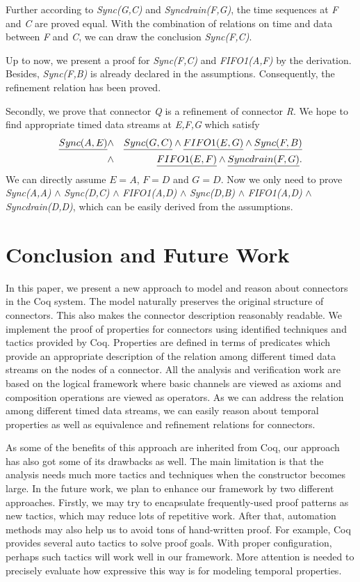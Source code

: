 \documentclass{llncs}
\begin{document}
\begin{example}[Equivalence]
Further according to \emph{Sync(G,C)} and \emph{Syncdrain(F,G)}, the time sequences at \emph{F} and \emph{C} are proved equal. With the combination of relations on time and data between \emph{F} and \emph{C}, we can draw the conclusion \emph{Sync(F,C)}.


Up to now, we present a proof for \emph{Sync(F,C)} and \emph{FIFO1(A,F)} by the derivation. Besides, \emph{Sync(F,B)} is already declared in the assumptions. Consequently, the refinement relation has been proved.

Secondly, we prove that connector \emph{Q} is a refinement of connector \emph{R}.
We hope to find appropriate timed data streams at \emph{E,F,G}  which satisfy
\begin{eqnarray*}
\emph{Sync(A,E)}&\wedge& \emph{Sync(G,C)} \wedge \emph{FIFO1(E,G)}\wedge \emph{Sync(F,B)}\\
 &\wedge& \emph{FIFO1(E,F)}\wedge \emph{Syncdrain(F,G)}.
\end{eqnarray*}
We can directly assume $E=A$, $F=D$ and $G=D$. Now we only need to prove
\emph{Sync(A,A)} $\wedge$  \emph{Sync(D,C)}  $\wedge$  \emph{FIFO1(A,D)} $\wedge$  \emph{Sync(D,B)} $\wedge$ \emph{FIFO1(A,D)} $\wedge$ \emph{Syncdrain(D,D)}, which can be easily derived from the assumptions.
\end{example}




\section{Conclusion and Future Work}\label{sec:conclusion}
In this paper, we present a new approach to model and reason about connectors in the Coq system. The model naturally
preserves the original structure of connectors. This also makes the connector description reasonably readable. We
implement the proof of properties for connectors using identified techniques and tactics provided by Coq. Properties are
defined in terms of predicates which provide an appropriate description of the relation among different
timed data streams on the nodes of a connector. All the analysis and verification work are based on the logical framework
where basic channels are viewed as axioms and composition operations are viewed as operators. As we can address
the relation among different timed data streams, we can easily reason about temporal properties as well as equivalence
and refinement relations for connectors.

As some of the benefits of this approach are inherited from Coq, our approach has also got some of its drawbacks as well.
The main limitation is that the analysis needs much more tactics and techniques when the constructor becomes large.
In the future work, we plan to enhance our framework by two different approaches. Firstly, we may try to encapsulate
frequently-used proof patterns as new tactics, which may reduce lots of repetitive work. After that, automation methods
may also help us to avoid tons of hand-written proof. For example, Coq provides several auto tactics to solve proof
goals. With proper configuration, perhaps such tactics will work well in our framework. More attention is needed to precisely
evaluate how expressive this way is for modeling temporal properties.
\end{document}
